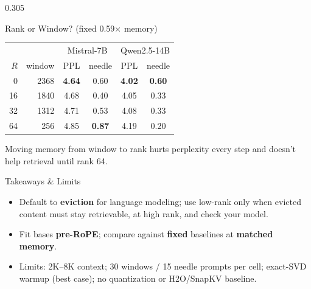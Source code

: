 \documentclass[final]{beamer}
\begin{document}
\begin{frame}[t]
\begin{columns}[t]
\begin{column}{0.305\paperwidth}
\begin{block}{Rank or Window? (fixed 0.59$\times$ memory)}
\begin{center}
\begin{tabular}{rrcccc}
\toprule
 & & \multicolumn{2}{c}{Mistral-7B} & \multicolumn{2}{c}{Qwen2.5-14B} \\
$R$ & window & PPL & needle & PPL & needle \\
\midrule
0 & 2368 & \textbf{4.64} & 0.60 & \textbf{4.02} & \textbf{0.60} \\
16 & 1840 & 4.68 & 0.40 & 4.05 & 0.33 \\
32 & 1312 & 4.71 & 0.53 & 4.08 & 0.33 \\
64 & 256 & 4.85 & \textbf{0.87} & 4.19 & 0.20 \\
\bottomrule
\end{tabular}
\end{center}
\vspace{0.1cm}
Moving memory from window to rank hurts perplexity every step and doesn't
help retrieval until rank 64.
\end{block}

\begin{block}{Takeaways \& Limits}
\begin{itemize}
  \item Default to \textbf{eviction} for language modeling; use low-rank only when evicted content must stay retrievable, at high rank, and check your model.
  \item Fit bases \textbf{pre-RoPE}; compare against \textbf{fixed} baselines at \textbf{matched memory}.
  \item Limits: 2K--8K context; 30 windows / 15 needle prompts per cell; exact-SVD warmup (best case); no quantization or H2O/SnapKV baseline.
\end{itemize}
\end{block}

\end{column}
\end{columns}

\end{frame}
\end{document}
